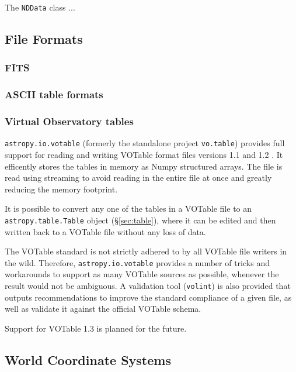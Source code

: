 \documentclass[traditabstract]{aa}
\begin{document}
The \texttt{NDData} class ...

\subsection{File Formats}


\subsubsection{FITS}



\subsubsection{ASCII table formats}



\subsubsection{Virtual Observatory tables}

\texttt{astropy.io.votable} (formerly the standalone project
\texttt{vo.table}) provides full support for reading and writing
VOTable format files versions 1.1 and 1.2
\citep{ochsenbein2004votable,ochsenbein2009votable}.  It efficently
stores the tables in memory as Numpy structured arrays.  The file is
read using streaming to avoid reading in the entire file at once and
greatly reducing the memory footprint.

It is possible to convert any one of the tables in a VOTable file to
an \texttt{astropy.table.Table} object (\S\ref{sec:table}), where it
can be edited and then written back to a VOTable file without any loss
of data.

The VOTable standard is not strictly adhered to by all VOTable file
writers in the wild.  Therefore, \texttt{astropy.io.votable} provides
a number of tricks and workarounds to support as many VOTable sources
as possible, whenever the result would not be ambiguous.  A validation
tool (\texttt{volint}) is also provided that outputs recommendations
to improve the standard compliance of a given file, as well as
validate it against the official VOTable schema.

Support for VOTable 1.3 is planned for the future.

\subsection{World Coordinate Systems}
\end{document}
